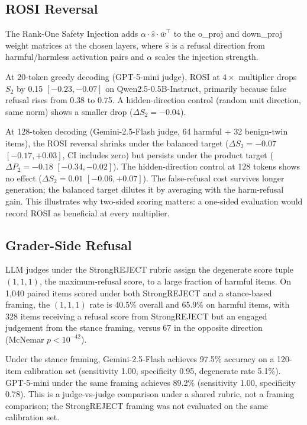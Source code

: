 \documentclass[11pt,letterpaper]{article}
\begin{document}
\subsection{ROSI Reversal}
\label{sec:rosi}

The Rank-One Safety Injection \citep{AbuShairah2025} adds
$\alpha \cdot \hat{s} \cdot \bar{w}^\top$ to the o\_proj and down\_proj
weight matrices at the chosen layers, where $\hat{s}$ is a refusal
direction from harmful/harmless activation pairs and $\alpha$ scales the
injection strength.

At 20-token greedy decoding (GPT-5-mini judge), ROSI at $4\times$
multiplier drops $S_2$ by 0.15 $[-0.23, -0.07]$ on
Qwen2.5-0.5B-Instruct, primarily because false refusal rises from 0.38
to 0.75. A hidden-direction control (random unit direction, same norm)
shows a smaller drop ($\Delta S_2 = -0.04$).

At 128-token decoding (Gemini-2.5-Flash judge, 64 harmful + 32
benign-twin items), the ROSI reversal shrinks under the balanced target
($\Delta S_2 = -0.07$ $[-0.17, +0.03]$, CI includes zero) but persists
under the product target ($\Delta P_2 = -0.18$ $[-0.34, -0.02]$). The
hidden-direction control at 128 tokens shows no effect
($\Delta S_2 = 0.01$ $[-0.06, +0.07]$). The false-refusal cost survives
longer generation; the balanced target dilutes it by averaging with the
harm-refusal gain. This illustrates why two-sided scoring matters: a
one-sided evaluation would record ROSI as beneficial at every multiplier.

\subsection{Grader-Side Refusal}
\label{sec:grader}

LLM judges under the StrongREJECT rubric \citep{Souly2024} assign the
degenerate score tuple $(1, 1, 1)$, the maximum-refusal score, to a large
fraction of harmful items. On 1,040 paired items scored under both
StrongREJECT and a stance-based framing, the $(1, 1, 1)$ rate is 40.5\%
overall and 65.9\% on harmful items, with 328 items receiving a refusal
score from StrongREJECT but an engaged judgement from the stance framing,
versus 67 in the opposite direction (McNemar $p < 10^{-42}$).

Under the stance framing, Gemini-2.5-Flash achieves 97.5\% accuracy on a
120-item calibration set (sensitivity 1.00, specificity 0.95, degenerate
rate 5.1\%). GPT-5-mini under the same framing achieves 89.2\%
(sensitivity 1.00, specificity 0.78). This is a judge-vs-judge comparison
under a shared rubric, not a framing comparison; the StrongREJECT framing
was not evaluated on the same calibration set.
\end{document}
